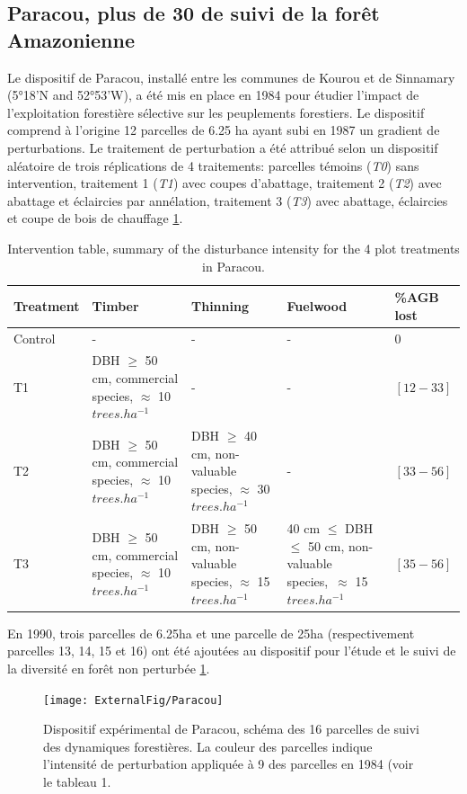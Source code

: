 \documentclass[
  11pt,
  french,
  A4paper,
  extrafontsizes,onecolumn,openright
  ]{memoir}
\begin{document}
\subsection{Paracou, plus de 30 de suivi de la forêt
Amazonienne}\label{paracou-plus-de-30-de-suivi-de-la-foret-amazonienne}

Le dispositif de Paracou, installé entre les communes de Kourou et de
Sinnamary (5°18'N and 52°53'W), a été mis en place en 1984 pour étudier
l'impact de l'exploitation forestière sélective sur les peuplements
forestiers. Le dispositif comprend à l'origine 12 parcelles de 6.25 ha
ayant subi en 1987 un gradient de perturbations. Le traitement de
perturbation a été attribué selon un dispositif aléatoire de trois
réplications de 4 traitements: parcelles témoins (\emph{T0}) sans
intervention, traitement 1 (\emph{T1}) avec coupes d'abattage,
traitement 2 (\emph{T2}) avec abattage et éclaircies par annélation,
traitement 3 (\emph{T3}) avec abattage, éclaircies et coupe de bois de
chauffage \ref{tab:InterventionTable}.

\begin{longtable}[t]{l|l|l|l|l}
\caption{\label{tab:InterventionTable}Intervention table, summary of the disturbance intensity for the 4 plot treatments in Paracou.}\\
\hline
Treatment & Timber & Thinning & Fuelwood & \%AGB lost\\
\hline
Control & - & - & - & 0\\
\hline
T1 & DBH $\geq$ 50 cm, commercial species, $\approx$ 10   $trees.ha^{-1}$ & - & - & $[12-33]$\\
\hline
T2 & DBH $\geq$ 50 cm, commercial species, $\approx$ 10  $trees.ha^{-1}$ & DBH $\geq$ 40 cm, non-valuable species, $\approx$ 30   $trees.ha^{-1}$ & - & $[33-56]$\\
\hline
T3 & DBH $\geq$ 50 cm, commercial species, $\approx$ 10  $trees.ha^{-1}$ & DBH $\geq$ 50 cm, non-valuable species, $\approx$ 15  $trees.ha^{-1}$ & 40 cm $\leq$ DBH $\leq$ 50 cm, non-valuable species,\ $\approx$ 15 $trees.ha^{-1}$ & $[35-56]$\\
\hline
\end{longtable}

En 1990, trois parcelles de 6.25ha et une parcelle de 25ha
(respectivement parcelles 13, 14, 15 et 16) ont été ajoutées au
dispositif pour l'étude et le suivi de la diversité en forêt non
perturbée \ref{fig:ParacouDesign}.

\begin{figure}

{\centering \texttt{[image: ExternalFig/Paracou]} 

}

\caption{Dispositif expérimental de Paracou, schéma des 16 parcelles de suivi des dynamiques forestières. La couleur des parcelles indique l'intensité de perturbation appliquée à 9 des parcelles en 1984 (voir le tableau 1.}\label{fig:ParacouDesign}
\end{figure}
\end{document}
